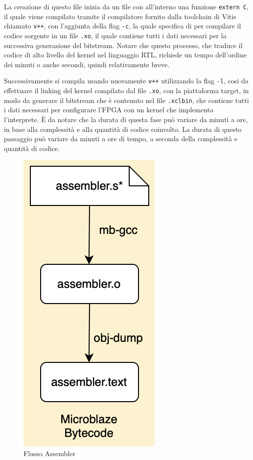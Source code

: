 La creazione di questo file inizia da un file con all'interno una funzione \texttt{extern C}, il quale viene compilato tramite il compilatore fornito dalla toolchain di Vitis chiamato \texttt{v++}, con l'aggiunta della flag \texttt{-c}, la quale specifica di per compilare il codice sorgente in un file \texttt{.xo}, il quale contiene tutti i dati necessari per la successiva generazione del bitstream. Notare che questo processo, che traduce il codice di alto livello del kernel nel linguaggio RTL, richiede un tempo dell'ordine dei minuti o anche secondi, quindi relativamente breve.

Successivamente si compila usando nuovamente \texttt{v++} utilizzando la flag \texttt{-l}, cosi da effettuare il linking del kernel compilato dal file \texttt{.xo}, con la piattaforma target, in modo da generare il bitstream che è contenuto nel file \texttt{.xclbin}, che contiene tutti i dati necessari per configurare l'FPGA con un kernel che implementa l'interprete. È da notare che la durata di questa fase può variare da minuti a ore, in base alla complessità e alla quantità di codice coinvolto. La durata di questo passaggio può variare da minuti a ore di tempo, a seconda della complessità e quantità di codice.


\clearpage

\begin{figure}[h!]
    \centering
    \includegraphics[scale=0.6]{images/Capitolo3/3_im.png}
    \caption{Flusso Assembler}
    \label{flussoassembler}
\end{figure}

